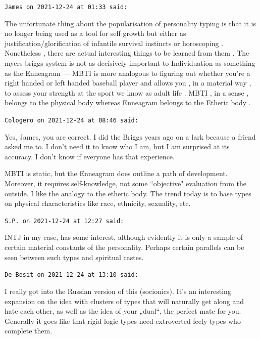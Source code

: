 \begin{footnotesize}\begin{sffamily}



\texttt{James on 2021-12-24 at 01:33 said: }

The unfortunate thing about the popularisation of personality typing is that it is no longer being used as a tool for self growth but either as justification/glorification of infantile survival instincts or horoscoping . Nonetheless , there are actual interesting things to be learned from them . The myers briggs system is not as decisively important to Individuation as something as the Enneagram — MBTI is more analogous to figuring out whether you're a right handed or left handed baseball player and allows you , in a material way , to assess your strength at the sport we know as adult life . MBTI , in a sense , belongs to the physical body whereas Enneagram belongs to the Etheric body .


\hfill

\texttt{Cologero on 2021-12-24 at 08:46 said: }

Yes, James, you are correct. I did the Briggs years ago on a lark because a friend asked me to. I don't need it to know who I am, but I am surprised at its accuracy. I don't know if everyone has that experience.

MBTI is static, but the Enneagram does outline a path of development. Moreover, it requires self-knowledge, not some ``objective" evaluation from the outside. I like the analogy to the etheric body. The trend today is to base types on physical characteristics like race, ethnicity, sexuality, etc.


\hfill

\texttt{S.P. on 2021-12-24 at 12:27 said: }

INTJ in my case, has some interest, although evidently it is only a sample of certain material constants of the personality. Perhaps certain parallels can be seen between such types and spiritual castes.


\hfill

\texttt{De Bosit on 2021-12-24 at 13:10 said: }

I really got into the Russian version of this (socionics). It's an interesting expansion on the idea with clusters of types that will naturally get along and hate each other, as well as the idea of your „dual``, the perfect mate for you. Generally it goes like that rigid logic types need extroverted feely types who complete them.


\end{sffamily}
\end{footnotesize}
